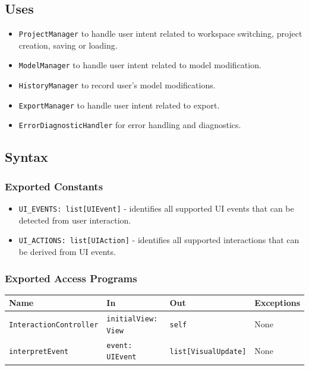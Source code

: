 \documentclass[12pt, titlepage]{article}
\begin{document}
\subsection{Uses}
\begin{itemize}
  \item \texttt{ProjectManager} to handle user intent related to workspace switching, project creation, saving or loading.
  \item \texttt{ModelManager} to handle user intent related to model modification.
  \item \texttt{HistoryManager} to record user's model modifications.
  \item \texttt{ExportManager} to handle user intent related to export.
  \item \texttt{ErrorDiagnosticHandler} for error handling and diagnostics.
\end{itemize}

\subsection{Syntax}

\subsubsection{Exported Constants}
\begin{itemize}
  \item \texttt{UI\_EVENTS: list[UIEvent]} - identifies all supported UI events that can be detected from user interaction.
  \item \texttt{UI\_ACTIONS: list[UIAction]} - identifies all supported interactions that can be derived from UI events.
\end{itemize}

\subsubsection{Exported Access Programs}
\begin{center}
\renewcommand{\arraystretch}{1.55}
\begin{tabular}{p{4.5cm} p{4cm} p{4cm} p{3cm}}
\toprule
\textbf{Name} & \textbf{In} & \textbf{Out} & \textbf{Exceptions} \\
\midrule
\texttt{InteractionController} & \texttt{initialView: View} & \texttt{self} & None \\ 
\texttt{interpretEvent} & \texttt{event: UIEvent} & \texttt{list[VisualUpdate]} & None \\
\bottomrule
\end{tabular}
\end{center}
\end{document}
